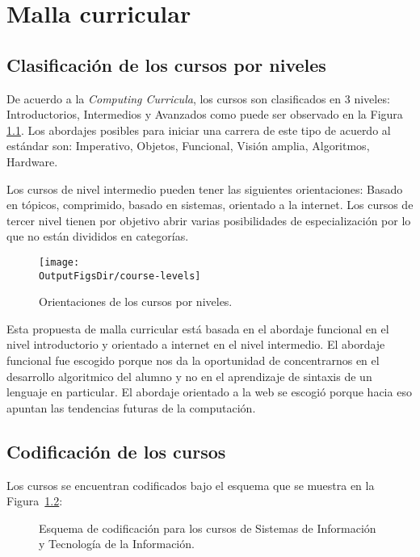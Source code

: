 \chapter{Malla curricular}\label{chap:GeneralInfo}

\section{Clasificación de los cursos por niveles}
De acuerdo a la \textit{Computing Curricula}, los cursos son clasificados en 3 niveles: 
Introductorios, Intermedios y Avanzados como puede ser observado en la Figura \ref{fig:niveles}. 
Los abordajes posibles para iniciar una carrera de este tipo de acuerdo al estándar son: 
Imperativo, Objetos, Funcional, Visión amplia, Algoritmos, Hardware.
 
Los cursos de nivel intermedio pueden tener las siguientes orientaciones: 
Basado en tópicos, comprimido, basado en sistemas, orientado a la internet. 
Los cursos de tercer nivel tienen por objetivo abrir varias posibilidades de 
especialización por lo que no están divididos en categorías.

\begin{figure}[ht]
   \centering
   \texttt{[image: \\OutputFigsDir/course-levels]}
   \caption{Orientaciones de los cursos por niveles.}
   \label{fig:niveles}
\end{figure}

Esta propuesta de malla curricular está basada en el abordaje funcional en el nivel introductorio y orientado 
a internet en el nivel intermedio. El abordaje funcional fue escogido porque nos da la oportunidad de 
concentrarnos en el desarrollo algoritmico del alumno y no en el aprendizaje de sintaxis de un lenguaje 
en particular. El abordaje orientado a la web se escogió porque hacia eso apuntan las 
tendencias futuras de la computación.

\section{Codificación de los cursos}
Los cursos se encuentran codificados bajo el esquema que se muestra en la Figura~\ref{fig:course-coding}:
\begin{figure}[ht]
   \centering
   \caption{Esquema de codificación para los cursos de Sistemas de Información y Tecnología de la Información.}
   \label{fig:course-coding}
\end{figure}
 
